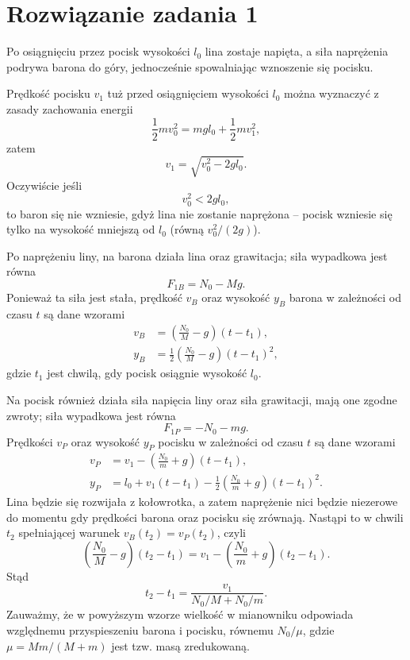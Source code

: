 \documentclass[12pt,a4paper]{article}
\begin{document}
\section*{Rozwiązanie zadania 1}

Po osiągnięciu przez pocisk wysokości $l_0$ lina zostaje napięta, a siła naprężenia podrywa barona do góry, jednocześnie spowalniając wznoszenie się pocisku.

Prędkość pocisku $v_1$ tuż przed osiągnięciem wysokości $l_0$ można wyznaczyć z zasady zachowania energii
\begin{equation}
    \frac{1}{2} m v_0^2 = m g l_0 + \frac{1}{2} m v_1^2,
\end{equation}
zatem
\begin{equation}
    v_1 = \sqrt{v_0^2 - 2gl_0}.
\end{equation}
Oczywiście jeśli
\begin{equation}
    v_0^2 < 2gl_0,
\end{equation}
to baron się nie wzniesie, gdyż lina nie zostanie naprężona – pocisk wzniesie się tylko na wysokość mniejszą od $l_0$ (równą $v_0^2/(2g)$).

Po naprężeniu liny, na barona działa lina oraz grawitacja; siła wypadkowa jest równa
\begin{equation}
    F_{1B} = N_0 - Mg.
\end{equation}
Ponieważ ta siła jest stała, prędkość $v_B$ oraz wysokość $y_B$ barona w zależności od czasu $t$ są dane wzorami
\begin{align}
    v_B &= \left( \frac{N_0}{M} - g \right) (t - t_1), \\
    y_B &= \frac{1}{2} \left( \frac{N_0}{M} - g \right) (t - t_1)^2,
\end{align}
gdzie $t_1$ jest chwilą, gdy pocisk osiągnie wysokość $l_0$.

Na pocisk również działa siła napięcia liny oraz siła grawitacji, mają one zgodne zwroty; siła wypadkowa jest równa
\begin{equation}
    F_{1P} = -N_0 - mg.
\end{equation}
Prędkości $v_P$ oraz wysokość $y_P$ pocisku w zależności od czasu $t$ są dane wzorami
\begin{align}
    v_P &= v_1 - \left( \frac{N_0}{m} + g \right) (t - t_1), \\
    y_P &= l_0 + v_1 (t - t_1) - \frac{1}{2} \left( \frac{N_0}{m} + g \right) (t - t_1)^2.
\end{align}
Lina będzie się rozwijała z kołowrotka, a zatem naprężenie nici będzie niezerowe do momentu gdy prędkości barona oraz pocisku się zrównają. Nastąpi to w chwili $t_2$ spełniającej warunek $v_B(t_2) = v_P(t_2)$, czyli
\begin{equation}
    \left( \frac{N_0}{M} - g \right) (t_2 - t_1) = v_1 - \left( \frac{N_0}{m} + g \right) (t_2 - t_1).
\end{equation}
Stąd
\begin{equation}
    t_2 - t_1 = \frac{v_1}{N_0/M + N_0/m}.
\end{equation}
Zauważmy, że w powyższym wzorze wielkość w mianowniku odpowiada względnemu przyspieszeniu barona i pocisku, równemu $N_0/\mu$, gdzie $\mu = Mm/(M+m)$ jest tzw. masą zredukowaną.
\end{document}
